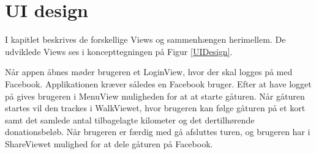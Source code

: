 \thispagestyle{fancy}
\chapter{UI design}

I kapitlet beskrives de forskellige Views og sammenhængen herimellem. De udviklede Views ses i koncepttegningen på Figur \ref{UIDesign}. 

Når appen åbnes møder brugeren et LoginView, hvor der skal logges på med Facebook. Applikationen kræver således en Facebook bruger. Efter at have logget på gives brugeren i MenuView muligheden for at at starte gåturen.  Når gåturen startes vil den trackes i WalkViewet, hvor brugeren kan følge gåturen på et kort samt det samlede antal tilbagelagte kilometer og det dertilhørende donationsbeløb. Når brugeren er færdig med gå afsluttes turen, og brugeren har i ShareViewet mulighed for at dele gåturen på Facebook.   

